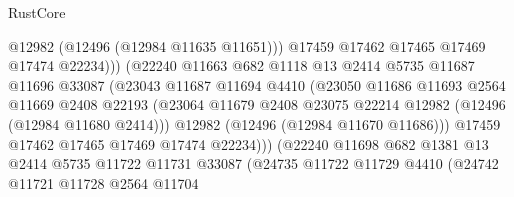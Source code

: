 \begin{lexlean}{RustCore}
\begin{coremodule}
                                      @12982
                                      (@12496 (@12984 @11635 @11651)))
                                    @17459
                                    @17462
                                    @17465
                                    @17469
                                    @17474
                                    @22234)))
                              (@22240
                                @11663
                                @682
                                @1118
                                @13
                                @2414
                                @5735
                                @11687
                                @11696
                                @33087
                                (@23043
                                  @11687
                                  @11694
                                  @4410
                                  (@23050
                                    @11686
                                    @11693
                                    @2564
                                    @11669
                                    @2408
                                    @22193
                                    (@23064
                                      @11679
                                      @2408
                                      @23075
                                      @22214
                                      @12982
                                      (@12496 (@12984 @11680 @2414)))
                                    @12982
                                    (@12496 (@12984 @11670 @11686)))
                                  @17459
                                  @17462
                                  @17465
                                  @17469
                                  @17474
                                  @22234)))
                            (@22240
                              @11698
                              @682
                              @1381
                              @13
                              @2414
                              @5735
                              @11722
                              @11731
                              @33087
                              (@24735
                                @11722
                                @11729
                                @4410
                                (@24742
                                  @11721
                                  @11728
                                  @2564
                                  @11704

\end{coremodule}
\end{lexlean}
